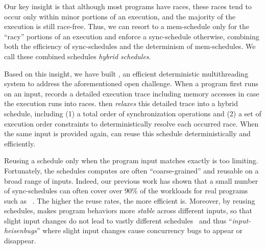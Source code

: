 Our key insight is that although most programs have races, these races
tend to occur only within minor portions of an execution, and the majority
of the execution is still race-free.  Thus, we can resort to a
mem-schedule only for the ``racy'' portions of an execution and enforce a
sync-schedule otherwise, combining both the efficiency of sync-schedules
and the determinism of mem-schedules. We call these combined schedules
\emph{hybrid schedules}.

Based on this insight, we have built \peregrine, an efficient deterministic
multithreading system to address the aforementioned open challenge.
When a program first runs on an input, \peregrine
records a detailed execution trace
including memory accesses in case the execution runs into races.
\peregrine then \emph{relaxes} this detailed trace into a hybrid schedule,
including (1) a total order of synchronization operations and (2) a set of
execution order constraints to
deterministically resolve each occurred race.  When the same input is provided 
again, \peregrine can reuse this schedule deterministically and efficiently.

Reusing a schedule only when the program input matches exactly is too
limiting.  Fortunately, the schedules \peregrine computes are often
``coarse-grained'' and
reusable on a broad range of inputs.  Indeed, our previous work has shown
that a small number of sync-schedules can often cover over 90\% of the
workloads for real programs such as \apache~\cite{cui:tern:osdi10}.  The
higher the reuse rates, the more efficient \peregrine is.  Moreover, by reusing
schedules, \peregrine makes program behaviors more \emph{stable} across
different inputs, so that slight input changes do not lead to vastly
different schedules~\cite{cui:tern:osdi10} and thus ``\emph{input-heisenbugs}''
where slight input changes cause concurrency bugs to appear or disappear.


